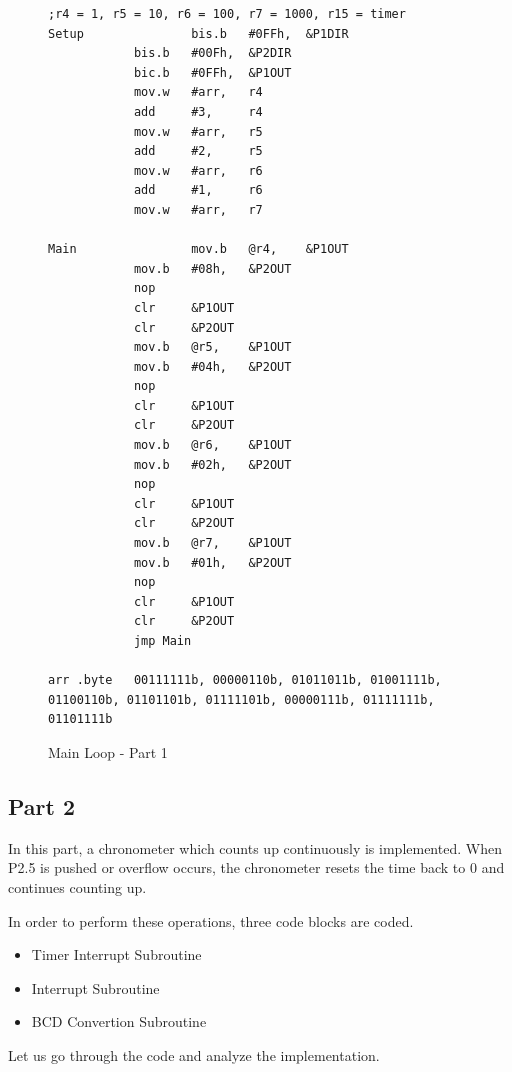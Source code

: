 \documentclass[pdftex,12pt,a4paper]{article}
\begin{document}
\begin{figure}[H]
    \centering
    \begin{lstlisting}[language={[x86masm]Assembler}]
;r4 = 1, r5 = 10, r6 = 100, r7 = 1000, r15 = timer
Setup		        bis.b	#0FFh,  &P1DIR
			bis.b	#00Fh,  &P2DIR
			bic.b	#0FFh,  &P1OUT
			mov.w	#arr,   r4
			add     #3,     r4
			mov.w	#arr,   r5
			add     #2,     r5
			mov.w	#arr,   r6
			add     #1,     r6
			mov.w	#arr,   r7
			
Main		        mov.b	@r4,    &P1OUT
			mov.b	#08h,   &P2OUT
			nop
			clr     &P1OUT
			clr     &P2OUT
			mov.b	@r5,    &P1OUT
			mov.b	#04h,   &P2OUT
			nop
			clr     &P1OUT
			clr     &P2OUT
			mov.b	@r6,    &P1OUT
			mov.b	#02h,   &P2OUT
			nop
			clr     &P1OUT
			clr     &P2OUT
			mov.b	@r7,    &P1OUT
			mov.b	#01h,   &P2OUT
			nop
			clr     &P1OUT
			clr     &P2OUT
			jmp Main

arr .byte   00111111b, 00000110b, 01011011b, 01001111b, 01100110b, 01101101b, 01111101b, 00000111b, 01111111b, 01101111b
    \end{lstlisting}
    \label{code:part1_0123}
    \caption{Main Loop - Part 1}
\end{figure}

\newpage
\subsection{Part 2}

In this part, a chronometer which counts up continuously is implemented. When P2.5 is pushed or overflow occurs, the chronometer resets the time back to 0 and continues counting up.

In order to perform these operations, three code blocks are coded.

\begin{itemize}
    \item Timer Interrupt Subroutine
    \item Interrupt Subroutine
    \item BCD Convertion Subroutine
\end{itemize}

Let us go through the code and analyze the implementation.
\end{document}
